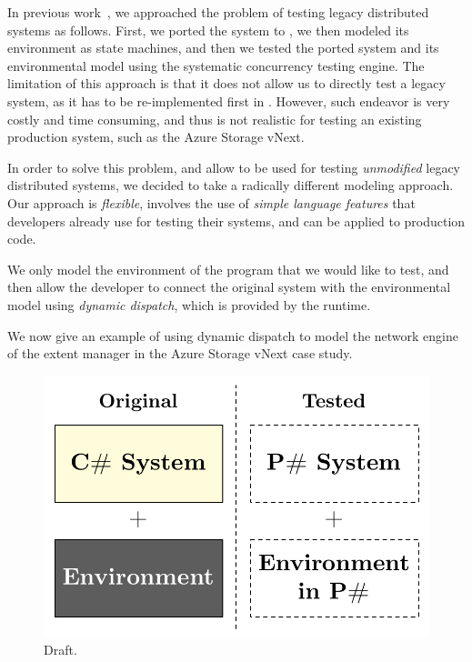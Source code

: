 In previous work~\cite{deligiannis2015psharp}, we approached the problem of testing legacy distributed systems as follows. First, we ported the system to \psharp, we then modeled its environment as \psharp state machines, and then we tested the ported system and its environmental model using the \psharp systematic concurrency testing engine. The limitation of this approach is that it does not allow us to directly test a legacy system, as it has to be re-implemented first in \psharp. However, such endeavor is very costly and time consuming, and thus is not realistic for testing an existing production system, such as the Azure Storage vNext.

In order to solve this problem, and allow \psharp to be used for testing \emph{unmodified} legacy distributed systems, we decided to take a radically different modeling approach. Our approach is \emph{flexible}, involves the use of \emph{simple language features} that developers already use for testing their systems, and can be applied to production code.

We only model the environment of the program that we would like to test, and then allow the developer to connect the original system with the environmental model using \emph{dynamic dispatch}, which is provided by the \csharp runtime.

We now give an example of using dynamic dispatch to model the network engine of the extent manager in the Azure Storage vNext case study.

\begin{figure}[t]
\centering
\includegraphics[width=\linewidth]{img/models_old}
\caption{Draft.}
\label{fig:oldapproach}
\end{figure}

